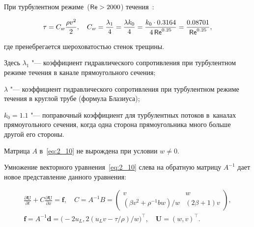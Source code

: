 При турбулентном режиме~(${\sf Re} > 2000$) течения~\cite{Idel4ik1}:

\begin{equation}

\tau = C_w \frac{\rho v^2 }{2} , \quad   

C_w  = \frac{\lambda_1}{4}= \frac{\lambda k_0}{4} = \frac{k_0 \cdot 0.3164}{4 \mathop{\sf Re}^{0.25}} = \frac{0.08701}{{\sf Re}^{0.25}}, \label{eq:2_16}

\end{equation}

где пренебрегается шероховатостью стенок трещины.

Здесь $\lambda_1$ "--- коэффициент гидравлического сопротивления при турбулентном режиме течения в канале прямоугольного сечения; 

$\lambda$ "--- коэффициент гидравлического сопротивления при турбулентном режиме течения в круглой трубе (формула Блазиуса); 

$k_0 = 1.1$ "--- поправочный коэффициент для турбулентных потоков в~каналах прямоугольного сечения, когда одна сторона прямоугольника много больше другой его стороны.



\smallskip



 \label{sec:3}

Матрица $A$ в~\eqref{eq:2_10} не вырождена при условии $w \neq 0$. 

Умножение векторного уравнения~\eqref{eq:2_10} слева на обратную матрицу $A^{-1}$ дает новое представление данного уравнения:

\begin{gather}

\frac{\partial {\boldsymbol  U}}{\partial t} + C \frac{\partial {\boldsymbol  U}}{\partial x} = {\boldsymbol  f},

\quad 

 C = A^{-1} B = \left( \begin{matrix}v & w \\ ({\beta v^2 + \rho^{-1} bw})/{w}   & (2\beta+1)v \end{matrix}\right), \label{eq:3_1} \\

{\boldsymbol  f}  = A^{-1} {\boldsymbol  d} = \bigl(-2u_L, \textstyle 2 ({ u_L v - \tau / \rho })/{w}\bigr)^{\top}, \quad {\boldsymbol  U} = \left(w,v\right)^{\top}. \label{eq:3_2}

\end{gather}



